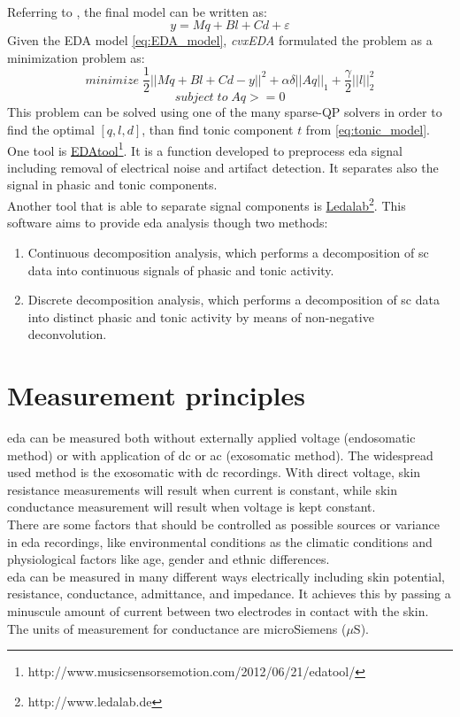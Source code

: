 \\
Referring to \cite{greco2016arousal}, the final model can be written as:
\begin{equation}
	\label{eq:EDA_model}
	y=Mq+Bl+Cd+\varepsilon 
\end{equation}
Given the EDA model \ref{eq:EDA_model}, \textit{cvxEDA} formulated the problem as a minimization problem as:
\begin{equation}
	minimize \; \dfrac{1}{2} ||Mq+Bl+Cd-y||^2+\alpha \delta ||Aq||_1+\dfrac{\gamma}{2}||l||^2_2
\end{equation}
\[subject \; to \; Aq>=0 \]
This problem can be solved using one of the many sparse-QP solvers in order to find the optimal $[q,l,d]$, than find tonic component $t$ from \ref{eq:tonic_model}.
\\ \indent
One tool is \href{http://www.musicsensorsemotion.com/2012/06/21/edatool/}{EDAtool}\footnote{http://www.musicsensorsemotion.com/2012/06/21/edatool/}. It is a function developed to preprocess \gls{eda} signal including removal of electrical noise and artifact detection. It separates also the signal in phasic and tonic components.
\\ \indent
Another tool that is able to separate signal components is \href{http://www.ledalab.de}{Ledalab}\footnote{http://www.ledalab.de}. This software aims to provide \gls{eda} analysis though two methods:
\begin{enumerate}
	\item  Continuous decomposition analysis, which performs a decomposition of \gls{sc} data into continuous signals of phasic and tonic activity.
	\item Discrete decomposition analysis, which performs a decomposition of \gls{sc} data into distinct phasic and tonic activity by means of non-negative deconvolution.
\end{enumerate}

\newpage
\section{Measurement principles}
\gls{eda} can be measured both without externally applied voltage (endosomatic method) or with application of \gls{dc} or \gls{ac} (exosomatic method). The widespread used method is the exosomatic with \gls{dc} recordings. With direct voltage, skin resistance measurements will result when current is constant, while skin conductance measurement will result when voltage is kept constant.
\\ \indent
There are some factors that should be controlled as possible sources or variance in \gls{eda} recordings, like environmental conditions as the climatic conditions and physiological factors like age, gender and ethnic differences.
\\ \indent
\gls{eda} can be measured in many different ways electrically including skin potential, resistance, conductance, admittance, and impedance. It achieves this by passing a minuscule amount of current between two electrodes in contact with the skin. The units of measurement for conductance are microSiemens ($\mu$S).


